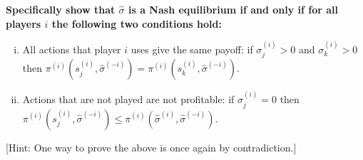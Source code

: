 \documentclass[10pt]{article}
\begin{document}
\textbf{Specifically show that \(\hat{\sigma}\) is a Nash equilibrium if and only if for
all players \(i\) the following two conditions hold:}

\begin{enumerate}[(i)]
    \item All actions that player \(i\) uses give the same payoff: if
    \(\sigma^{(i)}_j > 0\) and \(\sigma^{(i)}_k > 0\) then
    \(\pi^{(i)}(s^{(i)}_j, \hat{\sigma}^{(-i)}) = \pi^{(i)}(s^{(i)}_k,
    \hat{\sigma}^{(-i)})\).
    \item Actions that are not played are not profitable: if \(\sigma^{(i)}_j =
    0\) then \(\pi^{(i)}(s^{(i)}_j, \hat{\sigma}^{(-i)}) \leq
    \pi^{(i)}(\hat{\sigma}^{(i)}, \hat{\sigma}^{(-i)})\).
\end{enumerate}

[Hint: One way to prove the above is once again by contradiction.]
\end{document}
